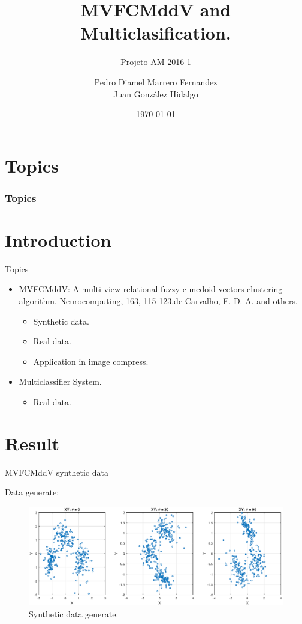 \documentclass{beamer}
\title{MVFCMddV and Multiclasification.}
\subtitle{Projeto AM 2016-1}
\author{Pedro Diamel Marrero Fernandez \\ Juan González Hidalgo }
\institute{Universidade Federal de Pernambuco\\Brasil {\Medium CIn}}
\date{\today}
\begin{document}
\maketitle

\section*{Topics}
\begin{frame}
	\frametitle{Topics}
	\tableofcontents[hideallsubsections]
\end{frame}

\section{Introduction}

\begin{frame}{Topics}	
\begin{itemize}
\item MVFCMddV: A multi-view relational fuzzy c-medoid vectors clustering algorithm. Neurocomputing, 163, 115-123.de Carvalho, F. D. A. and others.
\begin{itemize}
\item Synthetic data.
\item Real data.
\item Application in image compress.
\end{itemize}
\item Multiclassifier System.
\begin{itemize}
\item Real data.
\end{itemize}

\end{itemize}
\end{frame}


\section{Result}



\begin{frame}{MVFCMddV synthetic data}

Data generate:

\begin{figure}[h]
\centering
\includegraphics[width=4.5in]{../out/xy-sinteticos.eps}
\caption{Synthetic data generate.}
\label{fig:xy_sinteticos}
\end{figure}  

\end{frame}
\end{document}
